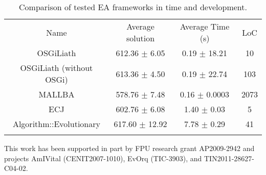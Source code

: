 \begin{table*}[htp]
\caption{Comparison of tested EA frameworks in time and development.}

\label{tab:resume}
\begin{center}
\begin{tabular}{cccc}
\hline\noalign{\smallskip}

Name    &  Average solution    & Average Time (s)  & LoC \\
\noalign{\smallskip}\hline\noalign{\smallskip}
OSGiLiath               &   612.36 $\pm$ 6.05  & 0.19 $\pm$ 18.21 &  10\\
OSGiLiath (without OSGi)&   613.36  $\pm$ 4.50 & 0.19 $\pm$ 22.74 &  103\\
MALLBA                  &   578.76 $\pm$ 7.48  & 0.16 $\pm$ 0.0003 &  2073\\
ECJ                     &   602.76 $\pm$ 6.08   & 1.40 $\pm$ 0.03 &  5\\
Algorithm::Evolutionary &   617.60 $\pm$ 12.92  & 7.78 $\pm$ 0.29 &  41\\
\noalign{\smallskip}\hline

\end{tabular}
\end{center}
\label{tablatimes}
\end{table*}



\begin{acknowledgements}
This work has been supported in part by FPU research grant AP2009-2942 and projects AmIVital (CENIT2007-1010), EvOrq (TIC-3903), and TIN2011-28627-C04-02.
\end{acknowledgements}


 






